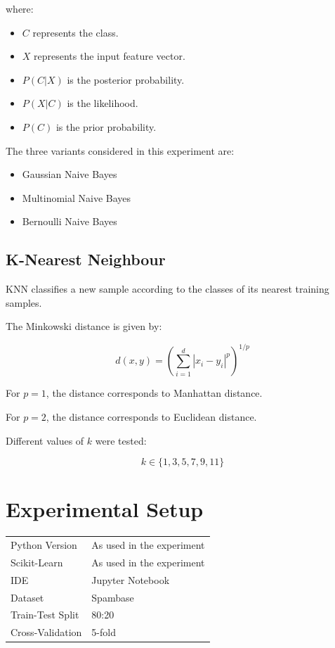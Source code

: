 \documentclass[12pt,a4paper]{article}
\begin{document}
where:

\begin{itemize}
    \item $C$ represents the class.
    \item $X$ represents the input feature vector.
    \item $P(C|X)$ is the posterior probability.
    \item $P(X|C)$ is the likelihood.
    \item $P(C)$ is the prior probability.
\end{itemize}

The three variants considered in this experiment are:

\begin{itemize}
    \item Gaussian Naive Bayes
    \item Multinomial Naive Bayes
    \item Bernoulli Naive Bayes
\end{itemize}


\subsection{K-Nearest Neighbour}

KNN classifies a new sample according to the classes of its nearest training samples.

The Minkowski distance is given by:

\[
d(x,y)=
\left(
\sum_{i=1}^{d}|x_i-y_i|^p
\right)^{1/p}
\]

For $p=1$, the distance corresponds to Manhattan distance.

For $p=2$, the distance corresponds to Euclidean distance.

Different values of $k$ were tested:

\[
k \in \{1,3,5,7,9,11\}
\]


\section{Experimental Setup}

\begin{tabular}{ll}
\toprule
Python Version & As used in the experiment \\
Scikit-Learn & As used in the experiment \\
IDE & Jupyter Notebook \\
Dataset & Spambase \\
Train-Test Split & 80:20 \\
Cross-Validation & 5-fold \\
\bottomrule
\end{tabular}
\end{document}
